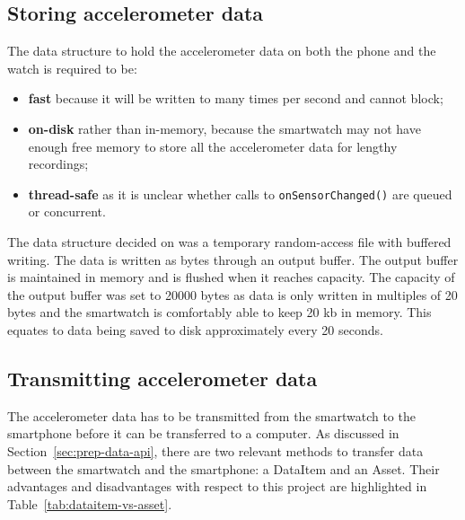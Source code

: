     \subsection{Storing accelerometer data}
      \label{sec:storing-accelerometer-data}
      The data structure to hold the accelerometer data on both the phone and the watch is required to be:
      \begin{itemize}
        \item \textbf{fast} because it will be written to many times per second and cannot block;
        \item \textbf{on-disk} rather than in-memory, because the smartwatch may not have enough free memory to store all the accelerometer data for lengthy recordings;
        \item \textbf{thread-safe} as it is unclear whether calls to \texttt{onSensorChanged()} are queued or concurrent.
      \end{itemize}
      
      The data structure decided on was a temporary random-access file with buffered writing. The data is written as bytes through an output buffer. The output buffer is maintained in memory and is flushed when it reaches capacity. The capacity of the output buffer was set to 20000 bytes as data is only written in multiples of 20 bytes and the smartwatch is comfortably able to keep 20 kb in memory. This equates to data being saved to disk approximately every 20 seconds.
      
    \subsection{Transmitting accelerometer data}
      \label{sec:Transmitting_accelerometer_data}
      The accelerometer data has to be transmitted from the smartwatch to the smartphone before it can be transferred to a computer. As discussed in Section~\ref{sec:prep-data-api}, there are two relevant methods to transfer data between the smartwatch and the smartphone: a DataItem and an Asset. Their advantages and disadvantages with respect to this project are highlighted in Table~\ref{tab:dataitem-vs-asset}.
      
